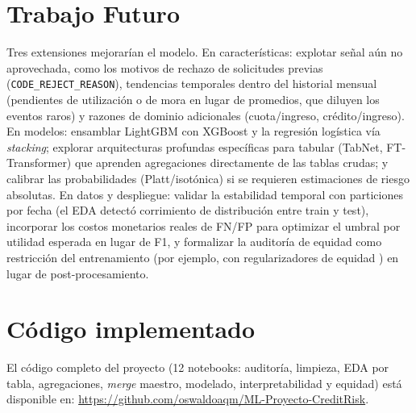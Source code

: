 \documentclass[journal]{IEEEtran}
\begin{document}
\section{Trabajo Futuro}

Tres extensiones mejorarían el modelo. En características: explotar señal aún no aprovechada, como los motivos de rechazo de solicitudes previas (\texttt{CODE\_REJECT\_REASON}), tendencias temporales dentro del historial mensual (pendientes de utilización o de mora en lugar de promedios, que diluyen los eventos raros) y razones de dominio adicionales (cuota/ingreso, crédito/ingreso). En modelos: ensamblar LightGBM con XGBoost y la regresión logística vía \textit{stacking}; explorar arquitecturas profundas específicas para tabular (TabNet, FT-Transformer) que aprenden agregaciones directamente de las tablas crudas; y calibrar las probabilidades (Platt/isotónica) si se requieren estimaciones de riesgo absolutas. En datos y despliegue: validar la estabilidad temporal con particiones por fecha (el EDA detectó corrimiento de distribución entre train y test), incorporar los costos monetarios reales de FN/FP para optimizar el umbral por utilidad esperada en lugar de F1, y formalizar la auditoría de equidad como restricción del entrenamiento (por ejemplo, con regularizadores de equidad \cite{kozodoi2022}) en lugar de post-procesamiento.

\section*{Código implementado}

El código completo del proyecto (12 notebooks: auditoría, limpieza, EDA por tabla, agregaciones, \textit{merge} maestro, modelado, interpretabilidad y equidad) está disponible en: \url{https://github.com/oswaldoaqm/ML-Proyecto-CreditRisk}.
\end{document}
